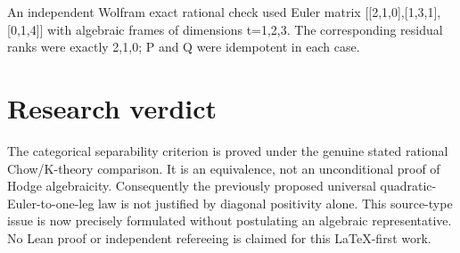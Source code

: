 \documentclass{article}
\begin{document}
An independent Wolfram exact rational
check used Euler matrix
[[2,1,0],[1,3,1],[0,1,4]]
with algebraic frames of dimensions
t=1,2,3. The corresponding residual
ranks were exactly 2,1,0;
P and Q were idempotent in each case.

\section*{Research verdict}
The categorical separability criterion
is proved under the genuine stated
rational Chow/K-theory comparison.
It is an equivalence, not an unconditional
proof of Hodge algebraicity. Consequently
the previously proposed universal
quadratic-Euler-to-one-leg law is
not justified by diagonal positivity
alone. This source-type issue is
now precisely formulated without
postulating an algebraic representative.
No Lean proof or independent refereeing
is claimed for this LaTeX-first work.
\end{document}
